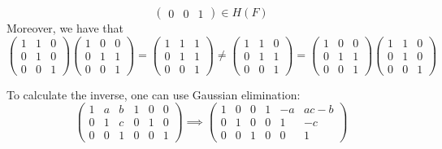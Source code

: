 \begin{problems}
\begin{solalph}
$$\begin{pmatrix}
            0 & 0 & 1
        \end{pmatrix} \in H(F)$$
        Moreover, we have that
        $$
        \begin{pmatrix}
            1 & 1 & 0 \\
            0 & 1 & 0 \\
            0 & 0 & 1
        \end{pmatrix}
        \begin{pmatrix}
            1 & 0 & 0 \\
            0 & 1 & 1 \\
            0 & 0 & 1
        \end{pmatrix} = 
        \begin{pmatrix}
            1 & 1 & 1 \\ 
            0 & 1 & 1 \\
            0 & 0 & 1
        \end{pmatrix} \neq
        \begin{pmatrix}
            1 & 1 & 0 \\
            0 & 1 & 1 \\
            0 & 0 & 1
        \end{pmatrix} = 
        \begin{pmatrix}
            1 & 0 & 0 \\
            0 & 1 & 1 \\
            0 & 0 & 1
        \end{pmatrix}
        \begin{pmatrix}
            1 & 1 & 0 \\
            0 & 1 & 0 \\
            0 & 0 & 1
        \end{pmatrix}$$
        \item To calculate the inverse, one can use Gaussian elimination:
        $$\left(\begin{array}{ccc|ccc}
            1 & a & b & 1 & 0 & 0 \\
            0 & 1 & c & 0 & 1 & 0 \\
            0 & 0 & 1 & 0 & 0 & 1
        \end{array}\right) \implies
        \left(\begin{array}{ccc|ccc}
            1 & 0 & 0 & 1 & -a & ac - b \\
            0 & 1 & 0 & 0 & 1 & -c \\
            0 & 0 & 1 & 0 & 0 & 1
        \end{array}\right)$$

\end{solalph}
\end{problems}
